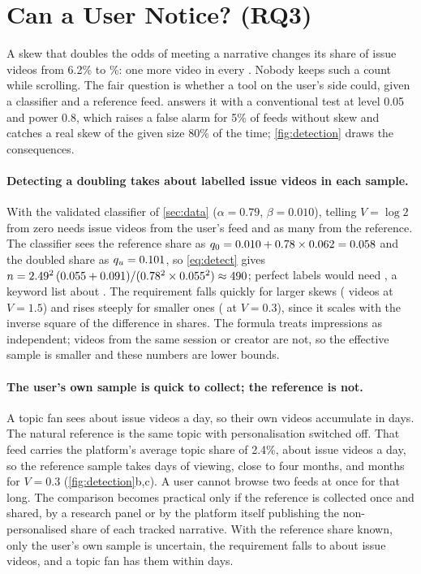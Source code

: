 \section{Can a User Notice? (RQ3)}
\label{sec:detection}

A skew that doubles the odds of meeting a narrative changes its share of issue videos from 6.2\% to \nExPu\%: one more video in every \nExGapOneIn. Nobody keeps such a count while scrolling. The fair question is whether a tool on the user's side could, given a classifier and a reference feed.  answers it with a conventional test at level 0.05 and power 0.8, which raises a false alarm for 5\% of feeds without skew and catches a real skew of the given size 80\% of the time; \cref{fig:detection} draws the consequences.

\paragraph{Detecting a doubling takes about \nDetNDouble{} labelled issue videos in each sample.} With the validated classifier of \cref{sec:data} ($\alpha=0.79$, $\beta=0.010$), telling $V=\log 2$ from zero needs \nDetNDouble{} issue videos from the user's feed and as many from the reference. The classifier sees the reference share as $q_0=0.010+0.78\times0.062=0.058$ and the doubled share as $q_u=0.101$, so \cref{eq:detect} gives $n=2.49^2\,(0.055+0.091)/(0.78^2\times0.055^2)\approx490$; perfect labels would need \nDetNPerfectDouble, a keyword list about \nDetNKeywordDouble. The requirement falls quickly for larger skews (\nDetNHigh{} videos at $V=1.5$) and rises steeply for smaller ones (\nDetNLow{} at $V=0.3$), since it scales with the inverse square of the difference in shares. The formula treats impressions as independent; videos from the same session or creator are not, so the effective sample is smaller and these numbers are lower bounds.

\paragraph{The user's own sample is quick to collect; the reference is not.} A topic fan sees about \nIssuePerDayFan{} issue videos a day, so their own \nDetNDouble{} videos accumulate in \nDetDaysFanDouble{} days. The natural reference is the same topic with personalisation switched off. That feed carries the platform's average topic share of 2.4\%, about \nIssuePerDayAvg{} issue videos a day, so the reference sample takes \nDetRefDaysDouble{} days of viewing, close to four months, and \nDetMonthsAvgLow{} months for $V=0.3$ (\cref{fig:detection}b,c). A user cannot browse two feeds at once for that long. The comparison becomes practical only if the reference is collected once and shared, by a research panel or by the platform itself publishing the non-personalised share of each tracked narrative. With the reference share known, only the user's own sample is uncertain, the requirement falls to about \nDetNKnownDouble{} issue videos, and a topic fan has them within \nDetDaysFanKnown{} days.


